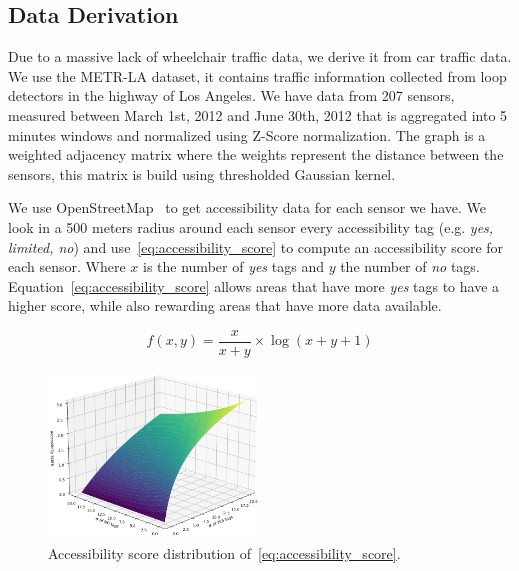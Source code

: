\subsection{Data Derivation}\label{subsec:data-derivation}
Due to a massive lack of wheelchair traffic data, we derive it from car traffic data.
We use the METR-LA dataset, it contains traffic information collected from loop detectors in the highway of Los Angeles.
We have data from 207 sensors, measured between March 1st, 2012 and June 30th, 2012 that is aggregated into 5 minutes windows and normalized using Z-Score normalization.
The graph is a weighted adjacency matrix where the weights represent the distance between the sensors, this matrix is build using thresholded Gaussian kernel\cite{Shuman_2013}.
\vspace{1em}

We use OpenStreetMap~\cite{OpenStreetMap} to get accessibility data for each sensor we have.
We look in a 500 meters radius around each sensor every accessibility tag (e.g. \textit{yes, limited, no}) and use~\eqref{eq:accessibility_score} to compute an accessibility score for each sensor.
Where $x$ is the number of \textit{yes} tags and $y$ the number of \textit{no} tags.
Equation~\eqref{eq:accessibility_score} allows areas that have more \textit{yes} tags to have a higher score, while also rewarding areas that have more data available.

\begin{equation}
    f(x, y) = \frac{x}{x + y} \times \log(x + y + 1)\label{eq:accessibility_score}
\end{equation}

\begin{figure}[htbp]
    \centering
    \includegraphics[width=0.5\textwidth]{resources/accessibility_score_function}
    \caption{Accessibility score distribution of~\eqref{eq:accessibility_score}.}
    \label{fig:accessibility_score_function}
\end{figure}


